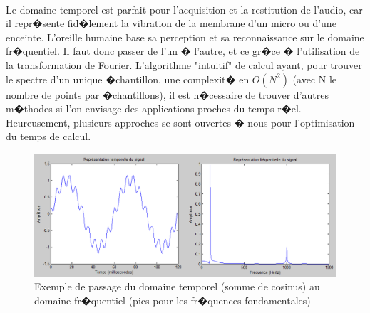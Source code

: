 {        	\paragraph{}
        	Le domaine temporel est parfait pour l'acquisition et la restitution de l'audio, car il repr�sente fid�lement la vibration 
        	de la membrane d'un micro ou d'une enceinte. L'oreille humaine base sa perception et sa reconnaissance sur le domaine fr�quentiel. 
        	Il faut donc passer de l'un � l'autre, et ce gr�ce � l'utilisation de la transformation de Fourier. L'algorithme "intuitif" 
        	de calcul ayant, pour trouver le spectre d'un unique �chantillon, une complexit� en $O(N^2)$  (avec N le nombre de points par 
        	�chantillons), il est n�cessaire de trouver d'autres m�thodes si l'on envisage des applications proches du temps r�el.  
        	Heureusement, plusieurs approches se sont ouvertes � nous pour l'optimisation du temps de calcul.
        	\begin{figure}[H]
				\begin{center}
					\includegraphics[width=15cm]{Images/tf2.png} 
				\end{center}
				\caption{Exemple de passage du domaine temporel (somme de cosinus) au domaine fr�quentiel (pics pour les fr�quences fondamentales)}
		\end{figure}
}
